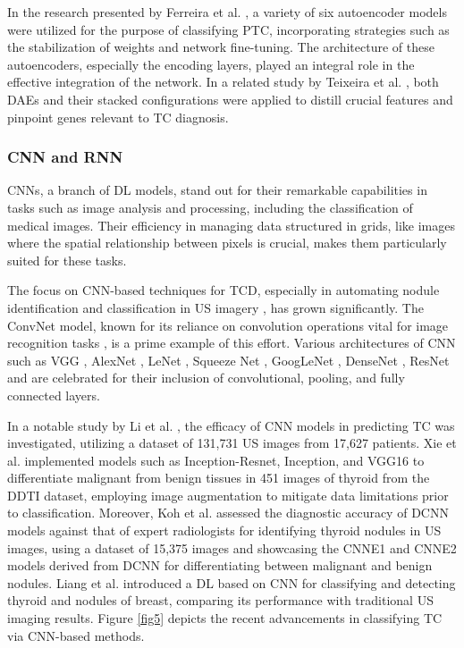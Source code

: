 \documentclass[a4paper,fleqn]{cas-sc}
\begin{document}
In the research presented by Ferreira et al. \cite{ferreira2018autoencoders}, a variety of six autoencoder models were utilized for the purpose of classifying \ac{PTC}, incorporating strategies such as the stabilization of weights and network fine-tuning. The architecture of these autoencoders, especially the encoding layers, played an integral role in the effective integration of the network. In a related study by Teixeira et al. \cite{teixeira2017learning}, both \acp{DAE} and their stacked configurations were applied to distill crucial features and pinpoint genes relevant to TC diagnosis.

\vskip2mm


\subsubsection{CNN and RNN}
\acp{CNN}, a branch of \ac{DL} models, stand out for their remarkable capabilities in tasks such as image analysis and processing, including the classification of medical images. Their efficiency in managing data structured in grids, like images where the spatial relationship between pixels is crucial, makes them particularly suited for these tasks.

The focus on \ac{CNN}-based techniques for \ac{TCD}, especially in automating nodule identification and classification in \ac{US} imagery \cite{liu2019automated}, has grown significantly. The ConvNet model, known for its reliance on convolution operations vital for image recognition tasks \cite{ha2019deep}, is a prime example of this effort. Various architectures of \ac{CNN} such as 
VGG \cite{guan2019deep}, 
AlexNet \cite{qiao2021deep}, 
LeNet \cite{zhang2020detection}, 
Squeeze Net \cite{tekchandani2021severity}, GoogLeNet \cite{chi2017thyroid}, 
DenseNet \cite{ke2020development}, ResNet \cite{cox2020hyperparameter} and  are celebrated for their inclusion of convolutional, pooling, and fully connected layers.

In a notable study by Li et al. \cite{li2019diagnosis}, the efficacy of \ac{CNN} models in predicting TC was investigated, utilizing a dataset of 131,731 \ac{US} images from 17,627 patients. Xie et al. \cite{xie2019thyroid} implemented models such as Inception-Resnet, Inception, and VGG16 to differentiate malignant from benign tissues in 451 images of thyroid from the DDTI dataset, employing image augmentation to mitigate data limitations prior to classification. Moreover, Koh et al. \cite{koh2020diagnosis} assessed the diagnostic accuracy of \ac{DCNN} models against that of expert radiologists for identifying thyroid nodules in \ac{US} images, using a dataset of 15,375 images and showcasing the CNNE1 and CNNE2 models derived from \ac{DCNN} for differentiating between malignant and benign nodules. Liang et al. \cite{liang2020convolutional} introduced a \ac{DL}  based on \ac{CNN} for classifying and detecting  thyroid and nodules of breast, comparing its performance with traditional \ac{US} imaging results. Figure \ref{fig5} depicts the recent advancements in classifying TC via \ac{CNN}-based methods.
\end{document}
